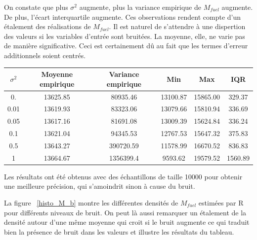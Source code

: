 \documentclass{article}
\begin{document}
On constate que plus $\sigma ^2$ augmente, plus la variance empirique de $M_{fuel}$ augmente. De plus, l'écart interquartile augmente. Ces observations rendent compte d'un étalement des réalisations de  $M_{fuel}$. Il est naturel de s'attendre à une dispertion des valeurs si les variables d'entrée sont bruitées. La moyenne, elle, ne varie pas de manière significative. Ceci est certainement dû au fait que les termes d'erreur additionnels soient centrés.  

\begin{center}
\begin{tabular}{ | c | c |  c | c |c|c|}
\hline			
   $\sigma ^2$ & Moyenne empirique & Variance empirique & Min & Max & IQR\\\hline
   0. &13625.85 & 80935.46 & 13100.87 & 15865.00 &  329.37\\
   0.01 & 13619.93&  83323.06& 13079.66& 15810.94 & 336.69\\
   0.05 & 13617.16& 81691.08 & 13009.39 &  15624.84 & 336.24\\
   0.1 &13621.04 & 94345.53 & 12767.53 & 15647.32 &  375.83\\
   0.5 & 13643.27& 390720.59 & 11578.99 & 16670.52 & 836.83\\
   1 &13664.67 & 1356399.4 & 9593.62 & 19579.52 & 1560.89\\
\hline
\end{tabular}
\end{center}
Les résultats ont été obtenus avec des échantillons de taille 10000 pour obtenir une meilleure précision, qui s'amoindrit sinon à cause du bruit.

La figure ~\ref{histo_M_b} montre les différentes densités de $M_{fuel}$ estimées par R pour différents niveaux de bruit. On peut là aussi remarquer un étalement de la densité autour d'une même moyenne qui croit si le bruit augmente ce qui traduit bien la présence de bruit dans les valeurs et illustre les résultats du tableau.
\end{document}
